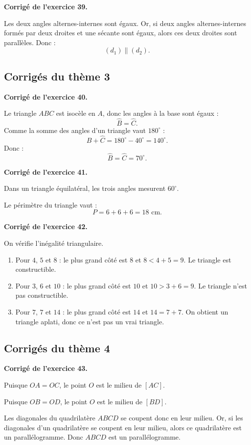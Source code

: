 \documentclass[11pt,a4paper]{article}
\newcounter{exercice}
\newenvironment{corrige}[1][]
{\par\medskip\noindent\textbf{Corrigé de l'exercice #1.}\par\smallskip}
{\medskip}
\begin{document}
\begin{corrige}[39]
Les deux angles alternes-internes sont égaux. Or, si deux angles alternes-internes formés par deux droites et une sécante sont égaux, alors ces deux droites sont parallèles. Donc :
\[
(d_1)\parallel(d_2).
\]
\end{corrige}

\subsection*{Corrigés du thème 3}

\begin{corrige}[40]
Le triangle $ABC$ est isocèle en $A$, donc les angles à la base sont égaux :
\[
\widehat{B}=\widehat{C}.
\]
Comme la somme des angles d'un triangle vaut $180^\circ$ :
\[
\widehat{B}+\widehat{C}=180^\circ-40^\circ=140^\circ.
\]
Donc :
\[
\widehat{B}=\widehat{C}=70^\circ.
\]
\end{corrige}

\begin{corrige}[41]
Dans un triangle équilatéral, les trois angles mesurent $60^\circ$.

Le périmètre du triangle vaut :
\[
P=6+6+6=18\text{ cm}.
\]
\end{corrige}

\begin{corrige}[42]
On vérifie l'inégalité triangulaire.

\begin{enumerate}
\item Pour $4$, $5$ et $8$ : le plus grand côté est $8$ et $8<4+5=9$. Le triangle est constructible.
\item Pour $3$, $6$ et $10$ : le plus grand côté est $10$ et $10>3+6=9$. Le triangle n'est pas constructible.
\item Pour $7$, $7$ et $14$ : le plus grand côté est $14$ et $14=7+7$. On obtient un triangle aplati, donc ce n'est pas un vrai triangle.
\end{enumerate}
\end{corrige}

\subsection*{Corrigés du thème 4}

\begin{corrige}[43]
Puisque $OA=OC$, le point $O$ est le milieu de $[AC]$.

Puisque $OB=OD$, le point $O$ est le milieu de $[BD]$.

Les diagonales du quadrilatère $ABCD$ se coupent donc en leur milieu. Or, si les diagonales d'un quadrilatère se coupent en leur milieu, alors ce quadrilatère est un parallélogramme. Donc $ABCD$ est un parallélogramme.
\end{corrige}
\end{document}
